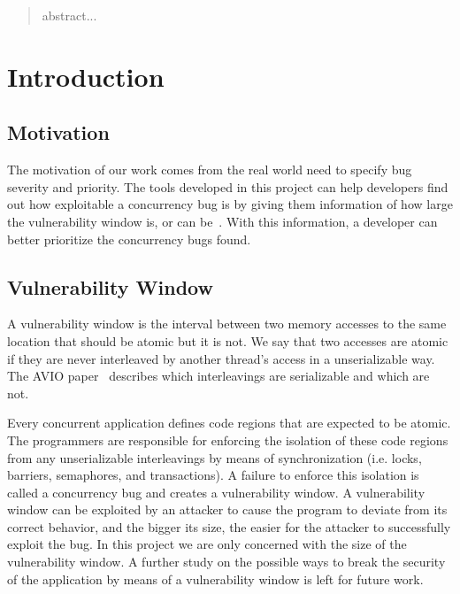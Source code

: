 \documentclass{acm_proc_article-sp}
\begin{document}
\maketitle
\begin{abstract}

abstract...

\end{abstract}

\section{Introduction}

\subsection{Motivation}
The motivation of our work comes from the real world need to specify bug severity and priority. The tools developed in this project can help developers find out how exploitable a concurrency bug is by giving them information of how large the vulnerability window is, or can be~\cite{yang2012concurrency}. With this information, a developer can better prioritize the concurrency bugs found.


\subsection{Vulnerability Window}
A vulnerability window is the interval between two memory accesses to the same location that should be atomic but it is not. We say that two accesses are atomic if they are never interleaved by another thread's access in a unserializable way. The AVIO paper~\cite{lu2006avio} describes which interleavings are serializable and which are not.

Every concurrent application defines code regions that are expected to be atomic. The programmers are responsible for enforcing the isolation of these code regions from any unserializable interleavings by means of synchronization (i.e. locks, barriers, semaphores, and transactions). A failure to enforce this isolation is called a concurrency bug and creates a vulnerability window. A vulnerability window can be exploited by an attacker to cause the program to deviate from its correct behavior, and the bigger its size, the easier for the attacker to successfully exploit the bug. In this project we are only concerned with the size of the vulnerability window. A further study on the possible ways to break the security of the application by means of a vulnerability window is left for future work.
\end{document}
